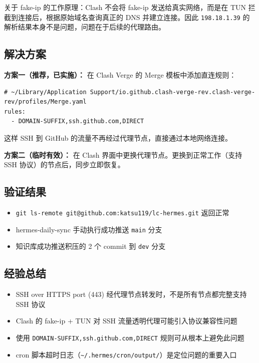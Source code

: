 关于 fake-ip 的工作原理：Clash 不会将 fake-ip 发送给真实网络，而是在 TUN 拦截到连接后，根据原始域名查询真正的 DNS 并建立连接。因此 \texttt{198.18.1.39} 的解析结果本身不是问题，问题在于后续的代理路由。

\subsection{解决方案}
\textbf{方案一（推荐，已实施）：} 在 Clash Verge 的 Merge 模板中添加直连规则：
\begin{verbatim}
# ~/Library/Application Support/io.github.clash-verge-rev.clash-verge-rev/profiles/Merge.yaml
rules:
  - DOMAIN-SUFFIX,ssh.github.com,DIRECT
\end{verbatim}
这样 SSH 到 GitHub 的流量不再经过代理节点，直接通过本地网络连接。

\textbf{方案二（临时有效）：} 在 Clash 界面中更换代理节点。更换到正常工作（支持 SSH 协议）的节点后，同步立即恢复。

\subsection{验证结果}
\begin{itemize}
  \item \texttt{git ls-remote git@github.com:katsu119/lc-hermes.git} 返回正常
  \item hermes-daily-sync 手动执行成功推送 \texttt{main} 分支
  \item 知识库成功推送积压的 2 个 commit 到 \texttt{dev} 分支
\end{itemize}

\subsection{经验总结}
\begin{itemize}
  \item SSH over HTTPS port (443) 经代理节点转发时，不是所有节点都完整支持 SSH 协议
  \item Clash 的 fake-ip + TUN 对 SSH 流量透明代理可能引入协议兼容性问题
  \item 使用 \texttt{DOMAIN-SUFFIX,ssh.github.com,DIRECT} 规则可从根本上避免此问题
  \item cron 脚本超时日志（\texttt{\textasciitilde/.hermes/cron/output/}）是定位问题的重要入口
\end{itemize}

